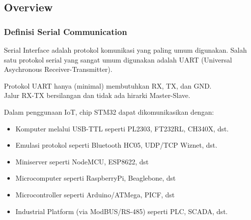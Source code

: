 \documentclass[table,dvipsnames]{beamer}
\begin{document}
	\subsection{Overview}
	\begin{frame}
		\frametitle{Definisi Serial Communication}
		\begin{exampleblock}{}
			Serial Interface adalah protokol komunikasi yang paling umum digunakan.
			Salah satu protokol serial yang sangat umum digunakan adalah UART (Universal Asychronous Receiver-Transmitter).
		\end{exampleblock}

		\begin{exampleblock}{}
			Protokol UART hanya (minimal) membutuhkan RX, TX, dan GND.\\
			Jalur RX-TX bersilangan dan tidak ada hirarki Master-Slave.
		\end{exampleblock}

		\begin{exampleblock}{}
			Dalam penggunaan IoT, chip STM32 dapat dikomunikasikan dengan:
			\begin{itemize}
				\item Komputer melalui USB-TTL seperti PL2303, FT232RL, CH340X, dst.
				\item Emulasi protokol seperti Bluetooth HC05, UDP/TCP Wiznet, dst.
				\item Miniserver seperti NodeMCU, ESP8622, dst
				\item Microcomputer seperti RaspberryPi, Beaglebone, dst
				\item Microcontroller seperti Arduino/ATMega, PICF, dst
				\item Industrial Platform (via ModBUS/RS-485) seperti PLC, SCADA, dst.
			\end{itemize}
		\end{exampleblock}
	\end{frame}
\end{document}
